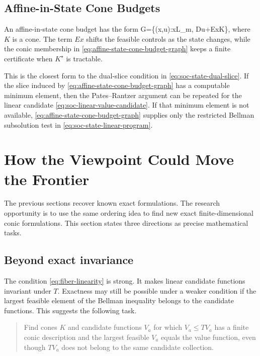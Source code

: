\documentclass{article}
\begin{document}
\subsection{Affine-in-State Cone Budgets}

An affine-in-state cone budget has the form
\BEQ
G=\{(x,u):x\in\mathcal L_m,
Du+Ex\in K\},
\label{eq:affine-state-cone-budget-graph}
\EEQ
where $K$ is a cone. The term $Ex$ shifts the feasible controls as the state changes, while the conic membership in \eqref{eq:affine-state-cone-budget-graph} keeps a finite certificate when $K^\star$ is tractable.

This is the closest form to the dual-slice condition in \eqref{eq:soc-state-dual-slice}. If the slice induced by \eqref{eq:affine-state-cone-budget-graph} has a computable minimum element, then the Pates--Rantzer argument can be repeated for the linear candidate \eqref{eq:soc-linear-value-candidate}. If that minimum element is not available, \eqref{eq:affine-state-cone-budget-graph} supplies only the restricted Bellman subsolution test in \eqref{eq:soc-state-linear-program}.

\section{How the Viewpoint Could Move the Frontier}

The previous sections recover known exact formulations. The research opportunity is to use the same ordering idea to find new exact finite-dimensional conic formulations. This section states three directions as precise mathematical tasks.

\subsection{Beyond exact invariance}

The condition \eqref{eq:fiber-linearity} is strong. It makes linear candidate functions invariant under $T$. Exactness may still be possible under a weaker condition if the largest feasible element of the Bellman inequality belongs to the candidate functions. This suggests the following task.

\begin{quote}
Find cones $K$ and candidate functions $V_a$ for which $V_a\leq TV_a$ has a finite conic description and the largest feasible $V_a$ equals the value function, even though $TV_a$ does not belong to the same candidate collection.
\end{quote}
\end{document}
